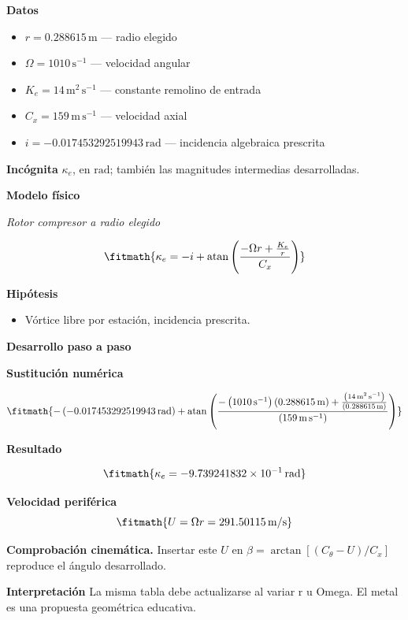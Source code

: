 \documentclass[10pt,openany]{book}
\begin{document}
\noindent\textbf{Datos}
\begin{itemize}
\item $r = 0.288615\,\mathrm{m}$ — radio elegido
\item $\Omega = 1010\,\mathrm{s}^{-1}$ — velocidad angular
\item $K_e = 14\,\mathrm{m}^{2}\,\mathrm{s}^{-1}$ — constante remolino de entrada
\item $C_x = 159\,\mathrm{m}\,\mathrm{s}^{-1}$ — velocidad axial
\item $i = -0.017453292519943\,\mathrm{rad}$ — incidencia algebraica prescrita
\end{itemize}

\noindent\textbf{Incógnita}
$\kappa_e$, en $\mathrm{rad}$; también las magnitudes intermedias desarrolladas.

\noindent\textbf{Modelo físico}

\noindent\textit{Rotor compresor a radio elegido}

\[
\fitmath{\kappa_e=- i + \operatorname{atan}{\left(\frac{- \Omega r + \frac{K_e}{r}}{C_x} \right)}}
\]

\noindent\textbf{Hipótesis}
\begin{itemize}
\item Vórtice libre por estación, incidencia prescrita.
\end{itemize}

\noindent\textbf{Desarrollo paso a paso}



\noindent\textbf{Sustitución numérica}

\[
\fitmath{- \left(-0.017453292519943\,\mathrm{rad}\right) + \operatorname{atan}{\left(\frac{- \left(1010\,\mathrm{s}^{-1}\right) \left(0.288615\,\mathrm{m}\right) + \frac{\left(14\,\mathrm{m}^{2}\,\mathrm{s}^{-1}\right)}{\left(0.288615\,\mathrm{m}\right)}}{\left(159\,\mathrm{m}\,\mathrm{s}^{-1}\right)} \right)}}
\]

\noindent\textbf{Resultado}

\[
\fitmath{\kappa_e=-9.739241832\times10^{-1}\,\mathrm{rad}}
\]

\noindent\textbf{Velocidad periférica}
\[
\fitmath{U=\Omega r=291.50115\,\mathrm{m/s}}
\]

\noindent\textbf{Comprobación cinemática.} Insertar este $U$ en $\beta=\arctan[(C_\theta-U)/C_x]$ reproduce el ángulo desarrollado.

\noindent\textbf{Interpretación}
La misma tabla debe actualizarse al variar r u Omega. El metal es una propuesta geométrica educativa.
\end{document}
